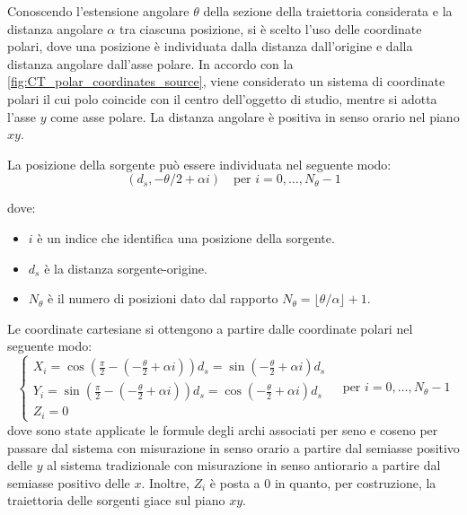 \documentclass[12pt,a4paper]{report}
\begin{document}
Conoscendo l'estensione angolare \(\theta\) della sezione della traiettoria considerata e la distanza angolare \(\alpha\) tra
ciascuna posizione, si è scelto l'uso delle coordinate polari, dove una posizione è individuata dalla distanza dall'origine e
dalla distanza angolare dall'asse polare.
In accordo con la \autoref{fig:CT_polar_coordinates_source}, viene considerato un sistema di coordinate polari il cui polo coincide con
il centro dell'oggetto di studio, mentre si adotta l'asse \(y\) come asse polare.
La distanza angolare è positiva in senso orario nel piano \(xy\).

La posizione della sorgente può essere individuata nel seguente modo:
\begin{equation} \label{eq:goniometric_source_polar}
  (d_s,-\theta/2 + \alpha i) \quad \text{per } i = 0, \dots, N_\theta - 1
\end{equation}

dove:
\begin{itemize}
  \item \(i\) è un indice che identifica una posizione della sorgente.
  \item \(d_s\) è la distanza sorgente-origine.
  \item \(N_\theta\) è il numero di posizioni dato dal rapporto \(N_\theta = \lfloor \theta/\alpha \rfloor + 1\).
\end{itemize}

Le coordinate cartesiane si ottengono a partire dalle coordinate polari nel seguente modo:
\begin{equation} \label{eq:gonometric_source_coordinates}
  \begin{cases}
    X_i = \cos(\frac{\pi}{2} - (-\frac{\theta}{2} + \alpha i)) d_s = \sin(-\frac{\theta}{2} + \alpha i) d_s \\
    Y_i = \sin(\frac{\pi}{2} - (-\frac{\theta}{2} + \alpha i)) d_s = \cos(-\frac{\theta}{2} + \alpha i) d_s \\
    Z_i = 0
  \end{cases} \quad \text{per } i = 0, \dots, N_\theta - 1
\end{equation}
dove sono state applicate le formule degli archi associati per seno e coseno per passare dal sistema con misurazione in senso
orario a partire dal semiasse positivo delle \(y\) al sistema tradizionale con misurazione in senso antiorario a partire dal
semiasse positivo delle \(x\).
Inoltre, \(Z_i\) è posta a \(0\) in quanto, per costruzione, la traiettoria delle sorgenti giace sul piano \(xy\).
\end{document}
